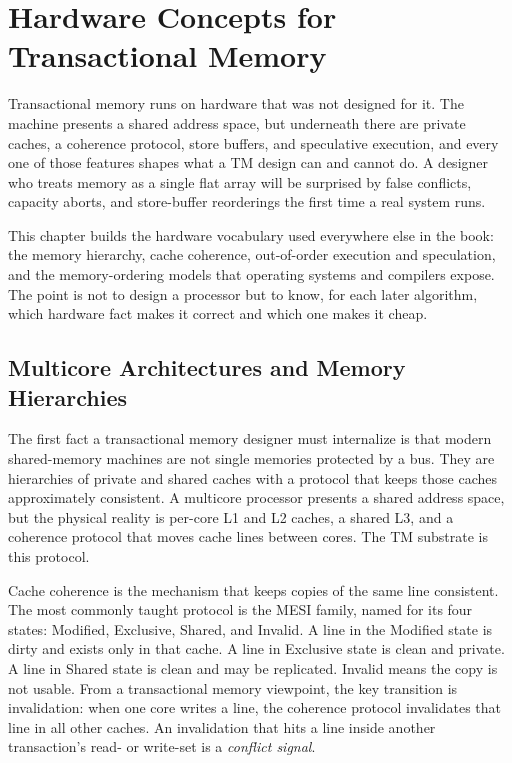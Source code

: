 \chapter{Hardware Concepts for Transactional Memory}

Transactional memory runs on hardware that was not designed for it. The
machine presents a shared address space, but underneath there are private
caches, a coherence protocol, store buffers, and speculative execution, and
every one of those features shapes what a TM design can and cannot do. A
designer who treats memory as a single flat array will be surprised by false
conflicts, capacity aborts, and store-buffer reorderings the first time a real
system runs.

This chapter builds the hardware vocabulary used everywhere else in the book:
the memory hierarchy, cache coherence, out-of-order execution and speculation,
and the memory-ordering models that operating systems and compilers expose.
The point is not to design a processor but to know, for each later algorithm,
which hardware fact makes it correct and which one makes it cheap.

\section{Multicore Architectures and Memory Hierarchies}

The first fact a transactional memory designer must internalize is that modern
shared-memory machines are not single memories protected by a bus. They are
hierarchies of private and shared caches with a protocol that keeps those
caches approximately consistent. A multicore processor presents a shared
address space, but the physical reality is per-core L1 and L2 caches, a shared
L3, and a coherence protocol that moves cache lines between cores. The TM
substrate is this protocol.

Cache coherence is the mechanism that keeps copies of the same line
consistent. The most commonly taught protocol is the MESI family, named for
its four states: Modified, Exclusive, Shared, and Invalid. A line in the
Modified state is dirty and exists only in that cache. A line in Exclusive
state is clean and private. A line in Shared state is clean and may be
replicated. Invalid means the copy is not usable. From a transactional memory
viewpoint, the key transition is invalidation: when one core writes a line,
the coherence protocol invalidates that line in all other caches. An
invalidation that hits a line inside another transaction's read- or write-set
is a \emph{conflict signal}.

